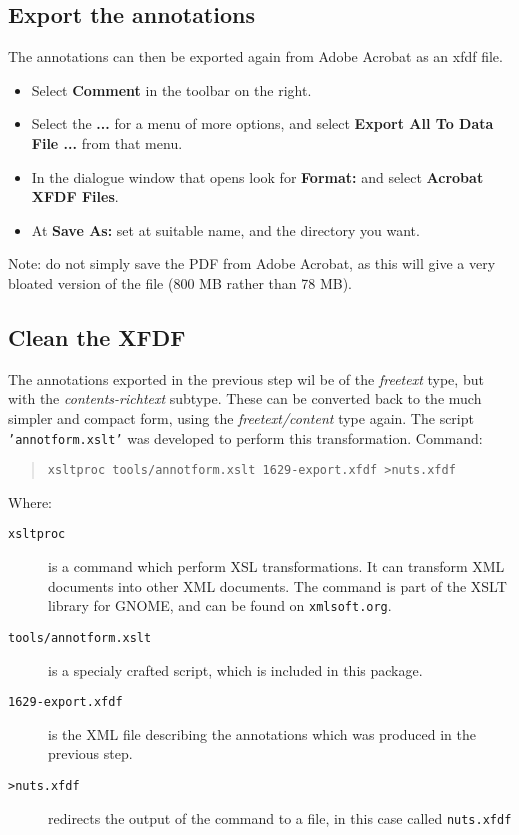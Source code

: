 \documentclass{article}
\begin{document}
\subsection{Export the annotations}
The annotations can then be exported again from Adobe Acrobat as an xfdf file.
\begin{itemize}
\item Select \textbf{Comment} in the toolbar on the right.
\item Select the \textbf{...} for a menu of more options,
and select \textbf{Export All To Data File ...} from that menu.
\item In the dialogue window that opens
look for \textbf{Format:} and select \textbf{Acrobat XFDF Files}.
\item At \textbf{Save As:} set at suitable name, and the directory you want.
\end{itemize}

Note: do not simply save the PDF from Adobe Acrobat, as this will give a
very bloated version of the file (800 MB rather than 78 MB).

\subsection{Clean the XFDF}
The annotations exported in the previous step
 wil be of the \emph{freetext} type,
 but with the \emph{contents-richtext} subtype.
These can be converted back to the much simpler and compact form,
 using the \emph{freetext/content} type again.
The script \texttt{'annotform.xslt'}
 was developed to perform this transformation.
Command:
\begin{quote}
  \texttt{xsltproc tools/annotform.xslt 1629-export.xfdf >nuts.xfdf}
\end{quote}
Where:
\begin{description}
\item[\texttt{xsltproc}] is a command  which perform XSL transformations.
It can transform XML documents into other XML documents.
The command is part of the XSLT library for GNOME, and can be found
on \texttt{xmlsoft.org}.
\item[\texttt{tools/annotform.xslt}] is a specialy crafted script,
which is included in this package.
\item[\texttt{1629-export.xfdf}] is the XML file describing the annotations
which was produced in the previous step.
\item[\texttt{>nuts.xfdf}] redirects the output of the command to a file,
in this case called \texttt{nuts.xfdf}
\end{description}
\end{document}
